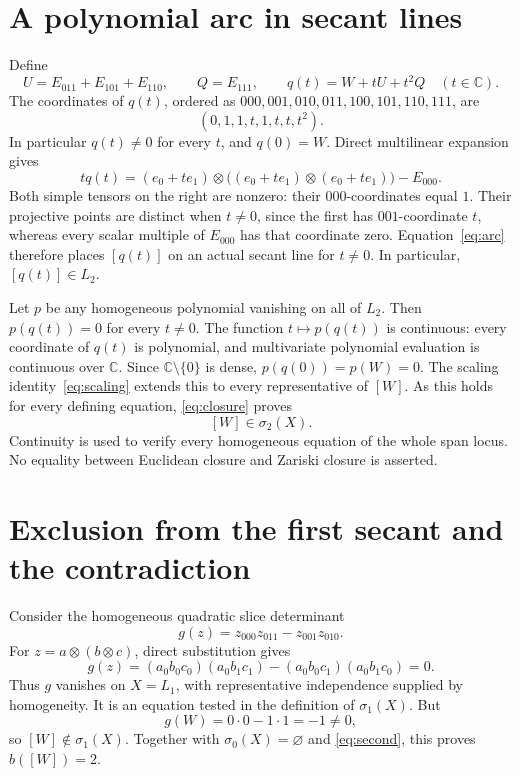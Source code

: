 \documentclass[11pt,a4paper]{article}
\newcommand{\C}{\mathbb C}
\begin{document}
\section{A polynomial arc in secant lines}
Define
\[
U=E_{011}+E_{101}+E_{110},\qquad Q=E_{111},\qquad q(t)=W+tU+t^2Q
\quad(t\in\C).
\]
The coordinates of $q(t)$, ordered as $000,001,010,011,100,101,110,111$, are
\[
(0,1,1,t,1,t,t,t^2).
\]
In particular $q(t)\ne0$ for every $t$, and $q(0)=W$. Direct multilinear expansion gives
\begin{equation}\label{eq:arc}
tq(t)=(e_0+te_1)\otimes\bigl((e_0+te_1)\otimes(e_0+te_1)\bigr)-E_{000}.
\end{equation}
Both simple tensors on the right are nonzero: their $000$-coordinates equal $1$. Their projective points are distinct when $t\ne0$, since the first has $001$-coordinate $t$, whereas every scalar multiple of $E_{000}$ has that coordinate zero. Equation~\eqref{eq:arc} therefore places $[q(t)]$ on an actual secant line for $t\ne0$. In particular, $[q(t)]\in L_2$.

Let $p$ be any homogeneous polynomial vanishing on all of $L_2$. Then $p(q(t))=0$ for every $t\ne0$. The function $t\mapsto p(q(t))$ is continuous: every coordinate of $q(t)$ is polynomial, and multivariate polynomial evaluation is continuous over $\C$. Since $\C\setminus\{0\}$ is dense, $p(q(0))=p(W)=0$. The scaling identity~\eqref{eq:scaling} extends this to every representative of $[W]$. As this holds for every defining equation, \eqref{eq:closure} proves
\begin{equation}\label{eq:second}
[W]\in\sigma_2(X).
\end{equation}
Continuity is used to verify every homogeneous equation of the whole span locus. No equality between Euclidean closure and Zariski closure is asserted.

\section{Exclusion from the first secant and the contradiction}
Consider the homogeneous quadratic slice determinant
\[
g(z)=z_{000}z_{011}-z_{001}z_{010}.
\]
For $z=a\otimes(b\otimes c)$, direct substitution gives
\[
g(z)=(a_0b_0c_0)(a_0b_1c_1)-(a_0b_0c_1)(a_0b_1c_0)=0.
\]
Thus $g$ vanishes on $X=L_1$, with representative independence supplied by homogeneity. It is an equation tested in the definition of $\sigma_1(X)$. But
\[
g(W)=0\cdot0-1\cdot1=-1\ne0,
\]
so $[W]\notin\sigma_1(X)$. Together with $\sigma_0(X)=\varnothing$ and \eqref{eq:second}, this proves $b([W])=2$.
\end{document}
